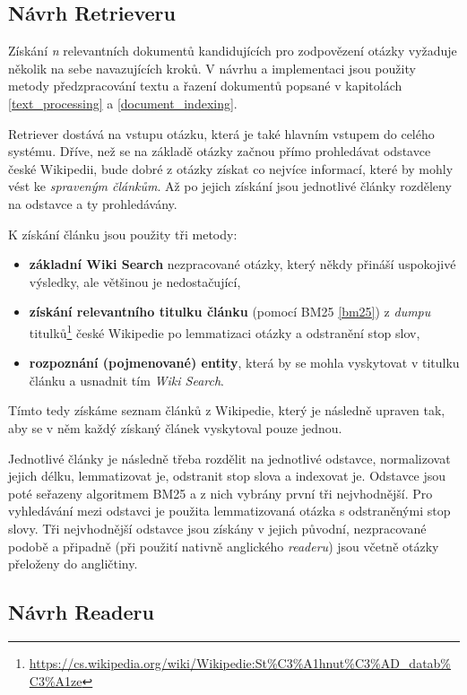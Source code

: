 \subsection{Návrh Retrieveru}
Získání \emph{n} relevantních dokumentů kandidujících pro zodpovězení otázky vyžaduje několik na sebe navazujících kroků. V návrhu a implementaci jsou použity metody předzpracování textu a řazení dokumentů popsané v kapitolách \ref{text_processing} a \ref{document_indexing}.\par
Retriever dostává na vstupu otázku, která je také hlavním vstupem do celého systému. Dříve, než se na základě otázky začnou přímo prohledávat odstavce české Wikipedii, bude dobré z otázky získat co nejvíce informací, které by mohly vést ke \emph{spraveným článkům}. Až po jejich získání jsou jednotlivé články rozděleny na odstavce a ty prohledávány.\par
\noindent K získání článku jsou použity tři metody:
\begin{itemize}
    \item \textbf{základní Wiki Search} nezpracované otázky, který někdy přináší uspokojivé výsledky, ale většinou je nedostačující,
    \item \textbf{získání relevantního titulku článku} (pomocí BM25 \ref{bm25}) z \emph{dumpu} titulků\footnote{\url{https://cs.wikipedia.org/wiki/Wikipedie:St\%C3\%A1hnut\%C3\%AD_datab\%C3\%A1ze}} české Wikipedie po lemmatizaci otázky a odstranění stop slov,
    \item \textbf{rozpoznání (pojmenované) entity}, která by se mohla vyskytovat v titulku článku a usnadnit tím \emph{Wiki Search}.
\end{itemize}
Tímto tedy získáme seznam článků z Wikipedie, který je následně upraven tak, aby se v něm každý získaný článek vyskytoval pouze jednou.\par
Jednotlivé články je následně třeba rozdělit na jednotlivé odstavce, normalizovat jejich délku, lemmatizovat je, odstranit stop slova a indexovat je. Odstavce jsou poté seřazeny algoritmem BM25 a z nich vybrány první tři nejvhodnější. Pro vyhledávání mezi odstavci je použita lemmatizovaná otázka s odstraněnými stop slovy. Tři nejvhodnější odstavce jsou získány v jejich původní, nezpracované podobě a připadně (při použití nativně anglického \emph{readeru}) jsou včetně otázky přeloženy do angličtiny.

\subsection{Návrh Readeru}

